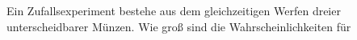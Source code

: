 \documentclass{abgabe}
\begin{document}
\begin{questions}
    \question
    Ein Zufallsexperiment bestehe aus dem gleichzeitigen Werfen dreier unterscheidbarer Münzen. 
    Wie groß sind die Wahrscheinlichkeiten für 
\end{questions}
\end{document}

